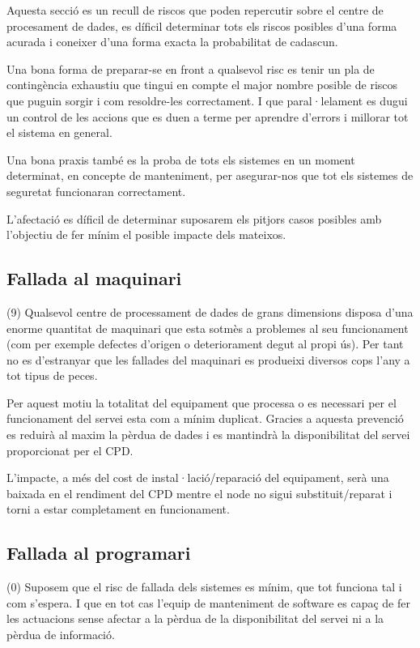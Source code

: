 \documentclass[a4paper, 11pt]{article}
\begin{document}
Aquesta secció es un recull de riscos que poden repercutir sobre el centre de procesament de dades, es díficil determinar tots els riscos posibles d'una forma acurada i coneixer d'una forma exacta la probabilitat de cadascun.

Una bona forma de preparar-se en front a qualsevol risc es tenir un pla de contingència exhaustiu que tingui en compte el major nombre posible de riscos que puguin sorgir i com resoldre-les correctament. I que paral·lelament es dugui un control de les accions que es duen a terme per aprendre d'errors i millorar tot el sistema en general. 

Una bona praxis també es la proba de tots els sistemes en un moment determinat, en concepte de manteniment, per asegurar-nos que tot els sistemes de seguretat funcionaran correctament.

L'afectació es díficil de determinar suposarem els pitjors casos posibles amb l'objectiu de fer mínim el posible impacte dels mateixos.

\subsection{Fallada al maquinari}

(9) Qualsevol centre de processament de dades de grans dimensions disposa d'una enorme quantitat de maquinari que esta sotmès a problemes al seu funcionament (com per exemple defectes d'origen o deteriorament degut al propi ús). Per tant no es d'estranyar que les fallades del maquinari es produeixi diversos cops l'any a tot tipus de peces.

Per aquest motiu la totalitat del equipament que processa o es necessari per el funcionament del servei esta com a mínim duplicat. Gracies a aquesta prevenció es reduirà al maxim la pèrdua de dades i es mantindrà la disponibilitat del servei proporcionat per el CPD. 

L'impacte, a més del cost de instal·lació/reparació del equipament, serà una baixada en el rendiment del CPD mentre el node no sigui substituit/reparat i torni a estar completament en funcionament.

\subsection{Fallada al programari}
(0) Suposem que el risc de fallada dels sistemes es mínim, que tot funciona tal i com s'espera. I que en tot cas l'equip de manteniment de software es capaç de fer les actuacions sense afectar a la pèrdua de la disponibilitat del servei ni a la pèrdua de informació. 
\end{document}
